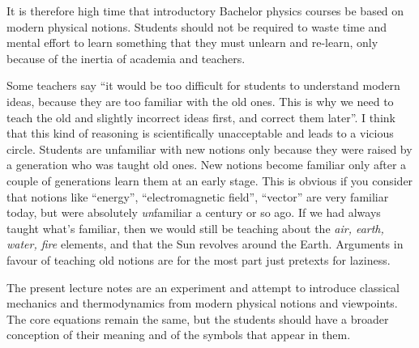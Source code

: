 \medskip

It is therefore high time that introductory Bachelor physics courses be based on modern physical notions. Students should not be required to waste time and mental effort to learn something that they must unlearn and re-learn, only because of the inertia of academia and teachers.

Some teachers say \enquote{it would be too difficult for students to understand modern ideas, because they are too familiar with the old ones. This is why we need to teach the old and slightly incorrect ideas first, and correct them later}. I think that this kind of reasoning is scientifically unacceptable and leads to a vicious circle. Students are unfamiliar with new notions only because they were raised by a generation who was taught old ones. New notions become familiar only after a couple of generations learn them at an early stage. This is obvious if you consider that notions like \enquote{energy}, \enquote{electromagnetic field}, \enquote{vector} are very familiar today, but were absolutely \emph{un}familiar a century or so ago. If we had always taught what's familiar, then we would still be teaching about the \emph{air, earth, water, fire} elements, and that the Sun revolves around the Earth. Arguments in favour of teaching old notions are for the most part just pretexts for laziness.

\medskip

The present lecture notes are an experiment and attempt to introduce classical mechanics and thermodynamics from modern physical notions and viewpoints. The core equations remain the same, but the students should have a broader conception of their meaning and of the symbols that appear in them.

